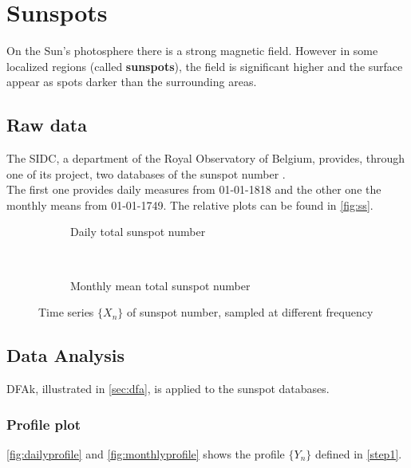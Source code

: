 \graphicspath{{../sunSpots/img/}}
\section{Sunspots}
On the Sun's photosphere there is a strong magnetic field. However in some localized regions (called \textbf{sunspots}), the field is significant higher and the surface appear as spots darker than the surrounding areas.

\subsection{Raw data}
The SIDC, a department of the Royal Observatory of Belgium, provides, through one of its project, two databases of the sunspot number \cite{sidc}. \\
The first one provides daily measures from 01-01-1818 and the other one the monthly means from 01-01-1749. The relative plots can be found in \autoref{fig:ss}.
\begin{figure}[!h]
	\centering
	\begin{subfigure}{0.48\textwidth}
		
		\caption{Daily total sunspot number}\label{fig:dailyss}
	\end{subfigure}
	~
	\begin{subfigure}{0.48\textwidth}
		
		\caption{Monthly mean total sunspot number}\label{fig:monthlyss}
	\end{subfigure}
\caption{Time series $\{X_n\}$ of sunspot number, sampled at different frequency}\label{fig:ss}
\end{figure}

\subsection{Data Analysis}
DFAk, illustrated in \autoref{sec:dfa}, is applied to the sunspot databases. 

\subsubsection{Profile plot}
\autoref{fig:dailyprofile} and \autoref{fig:monthlyprofile} shows the profile $\{Y_n\}$ defined in \autoref{step1}. 


